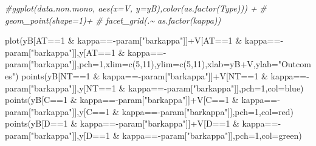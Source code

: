 \documentclass[
]{book}
\newenvironment{Shaded}{\begin{snugshade}}{\end{snugshade}}
\newcommand{\AttributeTok}[1]{\textcolor[rgb]{0.77,0.63,0.00}{#1}}
\newcommand{\CommentTok}[1]{\textcolor[rgb]{0.56,0.35,0.01}{\textit{#1}}}
\newcommand{\DecValTok}[1]{\textcolor[rgb]{0.00,0.00,0.81}{#1}}
\newcommand{\FunctionTok}[1]{\textcolor[rgb]{0.00,0.00,0.00}{#1}}
\newcommand{\NormalTok}[1]{#1}
\newcommand{\SpecialCharTok}[1]{\textcolor[rgb]{0.00,0.00,0.00}{#1}}
\newcommand{\StringTok}[1]{\textcolor[rgb]{0.31,0.60,0.02}{#1}}
\theoremstyle{definition}
\theoremstyle{definition}
\theoremstyle{definition}
\theoremstyle{definition}
\theoremstyle{remark}
\begin{document}
\begin{Shaded}
\begin{Highlighting}[]
\CommentTok{\#ggplot(data.non.mono, aes(x=V, y=yB),color(as.factor(Type))) +}
\CommentTok{\#    geom\_point(shape=1)+}
\CommentTok{\#    facet\_grid(.\textasciitilde{} as.factor(kappa))}

\FunctionTok{plot}\NormalTok{(yB[AT}\SpecialCharTok{==}\DecValTok{1} \SpecialCharTok{\&}\NormalTok{ kappa}\SpecialCharTok{=={-}}\NormalTok{param[}\StringTok{"barkappa"}\NormalTok{]]}\SpecialCharTok{+}\NormalTok{V[AT}\SpecialCharTok{==}\DecValTok{1} \SpecialCharTok{\&}\NormalTok{ kappa}\SpecialCharTok{=={-}}\NormalTok{param[}\StringTok{"barkappa"}\NormalTok{]],y[AT}\SpecialCharTok{==}\DecValTok{1} \SpecialCharTok{\&}\NormalTok{ kappa}\SpecialCharTok{=={-}}\NormalTok{param[}\StringTok{"barkappa"}\NormalTok{]],}\AttributeTok{pch=}\DecValTok{1}\NormalTok{,}\AttributeTok{xlim=}\FunctionTok{c}\NormalTok{(}\DecValTok{5}\NormalTok{,}\DecValTok{11}\NormalTok{),}\AttributeTok{ylim=}\FunctionTok{c}\NormalTok{(}\DecValTok{5}\NormalTok{,}\DecValTok{11}\NormalTok{),}\AttributeTok{xlab=}\StringTok{\textquotesingle{}yB+V\textquotesingle{}}\NormalTok{,}\AttributeTok{ylab=}\StringTok{"Outcomes"}\NormalTok{)}
\FunctionTok{points}\NormalTok{(yB[NT}\SpecialCharTok{==}\DecValTok{1} \SpecialCharTok{\&}\NormalTok{ kappa}\SpecialCharTok{=={-}}\NormalTok{param[}\StringTok{"barkappa"}\NormalTok{]]}\SpecialCharTok{+}\NormalTok{V[NT}\SpecialCharTok{==}\DecValTok{1} \SpecialCharTok{\&}\NormalTok{ kappa}\SpecialCharTok{=={-}}\NormalTok{param[}\StringTok{"barkappa"}\NormalTok{]],y[NT}\SpecialCharTok{==}\DecValTok{1} \SpecialCharTok{\&}\NormalTok{ kappa}\SpecialCharTok{=={-}}\NormalTok{param[}\StringTok{"barkappa"}\NormalTok{]],}\AttributeTok{pch=}\DecValTok{1}\NormalTok{,}\AttributeTok{col=}\StringTok{\textquotesingle{}blue\textquotesingle{}}\NormalTok{)}
\FunctionTok{points}\NormalTok{(yB[C}\SpecialCharTok{==}\DecValTok{1} \SpecialCharTok{\&}\NormalTok{ kappa}\SpecialCharTok{=={-}}\NormalTok{param[}\StringTok{"barkappa"}\NormalTok{]]}\SpecialCharTok{+}\NormalTok{V[C}\SpecialCharTok{==}\DecValTok{1} \SpecialCharTok{\&}\NormalTok{ kappa}\SpecialCharTok{=={-}}\NormalTok{param[}\StringTok{"barkappa"}\NormalTok{]],y[C}\SpecialCharTok{==}\DecValTok{1} \SpecialCharTok{\&}\NormalTok{ kappa}\SpecialCharTok{=={-}}\NormalTok{param[}\StringTok{"barkappa"}\NormalTok{]],}\AttributeTok{pch=}\DecValTok{1}\NormalTok{,}\AttributeTok{col=}\StringTok{\textquotesingle{}red\textquotesingle{}}\NormalTok{)}
\FunctionTok{points}\NormalTok{(yB[D}\SpecialCharTok{==}\DecValTok{1} \SpecialCharTok{\&}\NormalTok{ kappa}\SpecialCharTok{=={-}}\NormalTok{param[}\StringTok{"barkappa"}\NormalTok{]]}\SpecialCharTok{+}\NormalTok{V[D}\SpecialCharTok{==}\DecValTok{1} \SpecialCharTok{\&}\NormalTok{ kappa}\SpecialCharTok{=={-}}\NormalTok{param[}\StringTok{"barkappa"}\NormalTok{]],y[D}\SpecialCharTok{==}\DecValTok{1} \SpecialCharTok{\&}\NormalTok{ kappa}\SpecialCharTok{=={-}}\NormalTok{param[}\StringTok{"barkappa"}\NormalTok{]],}\AttributeTok{pch=}\DecValTok{1}\NormalTok{,}\AttributeTok{col=}\StringTok{\textquotesingle{}green\textquotesingle{}}\NormalTok{)}

\end{Highlighting}
\end{Shaded}
\end{document}

